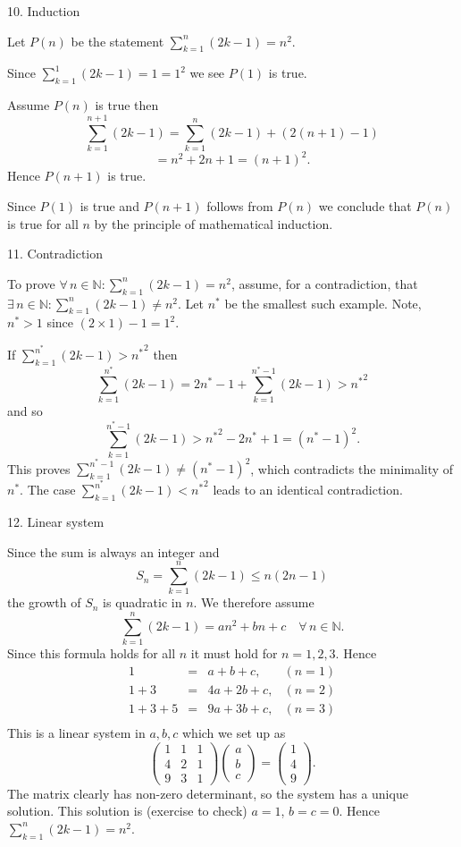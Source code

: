 \documentclass{article}
\begin{document}

10. Induction
		
Let \(P(n)\) be the statement \(\sum_{k=1}^n (2k-1) = n^2\).
	
Since \(\sum_{k=1}^1 (2k-1) = 1 = 1^2\) we see \(P(1)\) is true.
		
Assume \(P(n)\) is true then
\[ \sum_{k=1}^{n+1} (2k-1) = \sum_{k=1}^n (2k-1) + (2(n+1)-1) \]
\[= n^2 + 2n +1 = (n+1)^2.\]
Hence \(P(n+1)\) is true.
		
Since \(P(1)\) is true and \(P(n+1)\) follows from \(P(n)\) we conclude that \(P(n)\) is true for all \(n\) by the principle of mathematical induction.


11. Contradiction
		
To prove \(\forall\, n\in\mathbb{N}: \sum_{k=1}^n (2k-1) = n^2\),
assume, for a contradiction, that \(\exists\, n\in\mathbb{N}: \sum_{k=1}^n (2k-1) \neq n^2\).
Let \(n^*\) be the smallest such example.  Note, \(n^*>1\) since \((2\times 1)-1 = 1^2\).
		
If \(\sum_{k=1}^{n^*} (2k-1) > {n^*}^2\) then
\[ \sum_{k=1}^{n^*} (2k-1) = 2n^*-1 + \sum_{k=1}^{n^*-1} (2k-1) > {n^*}^2\]
and so
\[ \sum_{k=1}^{n^*-1} (2k-1) > {n^*}^2 - 2n^*+1 = (n^*-1)^2.\]
This proves \(\sum_{k=1}^{n^*-1} (2k-1) \neq (n^*-1)^2\), which contradicts the minimality of \(n^*\).  The case \(\sum_{k=1}^{n^*} (2k-1) < {n^*}^2\) leads to an identical contradiction.
		
\newpage

12. Linear system
		
Since the sum is always an integer and
\[S_n=\sum_{k=1}^{n} (2k-1) \leq n(2n-1)\]
the growth of \(S_n\) is quadratic in \(n\).  We therefore assume
\[ \sum_{k=1}^{n} (2k-1) = an^2 + bn +c\quad \forall\, n\in \mathbb{N}.\]
Since this formula holds for all \(n\) it must hold for \(n=1,2,3\).  Hence
\[
\begin{array}{lcll}
1    & = & a+b+c,   & (n=1)    \\
1+3  & = & 4a+2b+c, & (n=2)  \\
1+3+5& = & 9a+3b+c, & (n=3)\\
\end{array}
\]
This is a linear system in \(a,b,c\) which we set up as
\[ \left( \begin{array}{ccc} 1 & 1 & 1 \\ 4 & 2 & 1 \\ 9 & 3 & 1 \end{array} \right) \left(\begin{array}{c} a \\ b \\ c \end{array}\right) = \left(\begin{array}{c} 1 \\ 4 \\ 9\end{array}\right).\]
The matrix clearly has non-zero determinant, so the system has a unique solution.
This solution is (exercise to check) \(a=1\), \(b=c=0\).  Hence \(\sum_{k=1}^n (2k-1) = n^2\).
\end{document}
